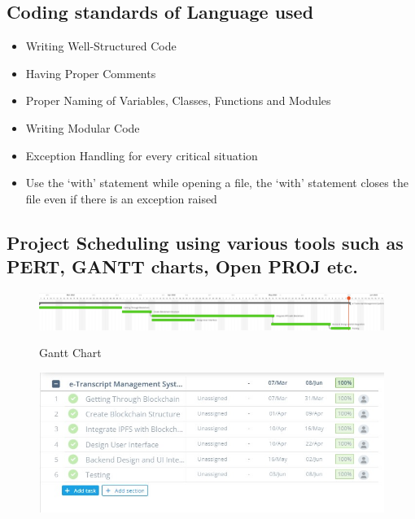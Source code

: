 \subsection{Coding standards of Language used }
\begin{itemize}
    \item Writing Well-Structured Code
    \item Having Proper Comments
    \item Proper Naming of Variables, Classes, Functions and Modules
    \item Writing Modular Code
    \item Exception Handling for every critical situation
    \item Use the ‘with’ statement while opening a file, the ‘with’ statement closes the file even if there is an exception raised
\end{itemize}

\subsection{Project Scheduling using various tools such as PERT, GANTT charts, Open PROJ etc.}

\begin{figure}[h]
    \centering
    \includegraphics[scale=0.16]{images/gantt chart.jpg}\\[0.5cm]
    \caption{Gantt Chart}
    \label{fig:Gantt Chart}
\end{figure}
\begin{figure}[h]
    \centering
    \includegraphics[scale=0.60]{images/gantt chart descriptions.jpeg}\\[0.5cm]
\end{figure}
\newpage


